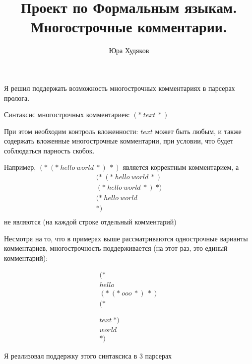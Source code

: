 \documentclass[12pt]{article}
\title{Проект по Формальным языкам. \\Многострочные комментарии.\\
 }
\author{Юра Худяков}
\begin{document}
	
	\maketitle

    Я решил поддержать возможность многострочных комментариях в парсерах пролога.

    Синтаксис многострочных комментариев: $(*\ text\ *)$

    При этом необходим контроль вложенности: $text$ может быть любым, и также содержать вложенные многострочные комментарии, при условии, что будет соблюдаться парность скобок. 

    Например, $(*\ (*\ hello\ world\ *)\ *)$ является корректным комментарием, а \[\begin{aligned} (*\ (*\ hello\ world\ *)\\ (*\ hello\ world\ *)\ *)\\ (*\ hello\ world\\ *)\\\end{aligned}\] не являются (на каждой строке отдельный комментарий)

    Несмотря на то, что в примерах выше рассматриваются однострочные варианты комментариев, многострочность поддерживается (на этот раз, это единый комментарий):

    \[
        \begin{aligned}
        (* \\
        hello\\
        (*\ (*\ ooo\ *)\ *) \\
        (*\\
        \\
        \\
        text\ *)\\
        world \\
        *)
    \end{aligned}
    \]

    \newpage

    Я реализовал поддержку этого синтаксиса в 3 парсерах
\end{document}
